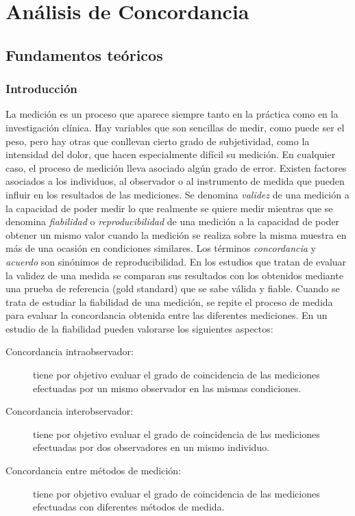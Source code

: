 
\chapter{Análisis de Concordancia}
\section{Fundamentos teóricos}
\subsection{Introducción}
La medición es un proceso que aparece siempre tanto en la práctica como en la investigación clínica. Hay variables que son sencillas de
medir, como puede ser el peso, pero hay otras que conllevan cierto grado de subjetividad, como la intensidad del dolor, que hacen
especialmente difícil su medición. En cualquier caso, el proceso de medición lleva asociado algún grado de error. Existen factores asociados
a los individuos, al observador o al instrumento de medida que pueden influir en los resultados de las mediciones. Se denomina \emph{validez} de
una medición a la capacidad de poder medir lo que realmente se quiere medir mientras que se denomina \emph{fiabilidad} o \emph{reproducibilidad} de una
medición a la capacidad de poder obtener un mismo valor cuando la medición se realiza sobre la misma muestra en más de una ocasión en
condiciones similares. Los términos \emph{concordancia} y \emph{acuerdo} son sinónimos de reproducibilidad. En los estudios que tratan de evaluar la
validez de una medida se comparan sus resultados con los obtenidos mediante una prueba de referencia (gold standard) que se sabe válida y
fiable. Cuando se trata de estudiar la fiabilidad de una medición, se repite el proceso de medida para evaluar la concordancia obtenida
entre las diferentes mediciones. En un estudio de la fiabilidad pueden valorarse los siguientes aspectos:

\begin{description}
\item[Concordancia intraobservador:] tiene por objetivo evaluar el grado de coincidencia de las mediciones efectuadas por un mismo
observador en las mismas condiciones.
\item[Concordancia interobservador:] tiene por objetivo evaluar el grado de coincidencia de las mediciones efectuadas por dos
observadores en un mismo individuo.
\item[Concordancia entre métodos de medición:] tiene por objetivo evaluar el grado de coincidencia de las mediciones efectuadas con
diferentes métodos de medida.
\end{description}

